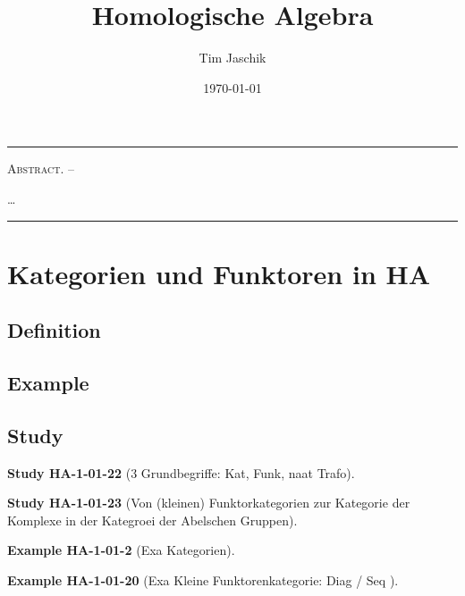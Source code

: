 \documentclass[10pt, letterpaper]{article}
\title{Homologische Algebra}
\author{Tim Jaschik}
\date{\today}
\renewenvironment{abstract}
  {
    \begin{adjustwidth}{1.5cm}{1.5cm}
    \small
    \textsc{Abstract. –}%
  }
  {
    \end{adjustwidth}
  }
\newcommand{\CustomHeading}[3]{%
  \par\medskip\noindent%
  \textbf{#1 #2} \textnormal{(#3)}.\enskip%
}
\newenvironment{EXA}[2]{\CustomHeading{Example}{#1}{#2}}{}
\newenvironment{STUD}[2]{\CustomHeading{Study}{#1}{#2}}{}
\begin{document}
\maketitle
\rule{\textwidth}{0.5pt}
\begin{abstract}
…
\end{abstract}
\rule{\textwidth}{0.5pt}
\vspace{0.5cm}

\tableofcontents

\pagebreak


\section{Kategorien und Funktoren in HA}

\subsection{Definition}

\subsection{Example}

\subsection{Study}



\begin{STUD}{HA-1-01-22}{3 Grundbegriffe: Kat, Funk, naat Trafo}

\end{STUD}

\begin{STUD}{HA-1-01-23}{Von (kleinen) Funktorkategorien zur Kategorie der Komplexe in der Kategroei der Abelschen Gruppen}

\end{STUD}







\begin{EXA}{HA-1-01-2}{Exa Kategorien}

\end{EXA}

\begin{EXA}{HA-1-01-20}{Exa Kleine Funktorenkategorie: Diag / Seq }

\end{EXA}
\end{document}
